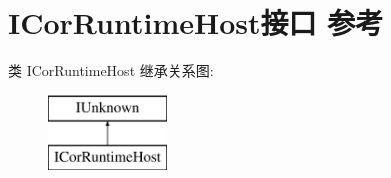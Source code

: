 \hypertarget{interface_i_cor_runtime_host}{}\section{I\+Cor\+Runtime\+Host接口 参考}
\label{interface_i_cor_runtime_host}
类 I\+Cor\+Runtime\+Host 继承关系图\+:\begin{figure}[H]
\begin{center}
\leavevmode
\includegraphics[height=2.000000cm]{interface_i_cor_runtime_host}
\end{center}
\end{figure}
